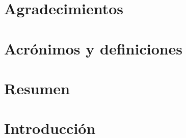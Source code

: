




%
%
%

\setmainfont{Calibri}



\section*{Agradecimientos}
%
\newpage


\tableofcontents


\newpage



\section*{Acrónimos y definiciones}
%

\section*{Resumen}
%

\section*{Introducción}
%

